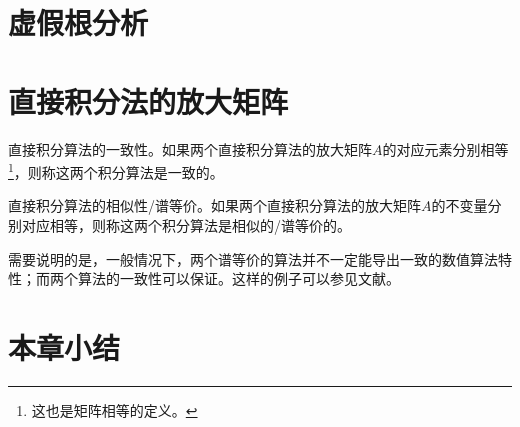 \section{虚假根分析}

\section{直接积分法的放大矩阵}

\begin{definition}
直接积分算法的一致性\cite{Hoff1988c}。如果两个直接积分算法的放大矩阵$A$的对应元素分别相等\footnote{这也是矩阵相等的定义。}，则称这两个积分算法是一致的。
\end{definition}

\begin{definition}
直接积分算法的相似性/谱等价\cite{Hoff1988c}。如果两个直接积分算法的放大矩阵$A$的不变量分别对应相等，则称这两个积分算法是相似的/谱等价的。
\end{definition}

需要说明的是，一般情况下，两个谱等价的算法并不一定能导出一致的数值算法特性；而两个算法的一致性可以保证。这样的例子可以参见文献。

\section{本章小结}


